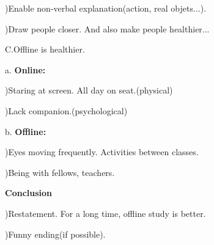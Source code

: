 \documentclass{article}
\begin{document}
{				\qquad{})Enable non-verbal explanation(action, real objets...).

				\qquad{})Draw people closer. And also make people healthier...

		C.\qquad Offline is healthier.

			\qquad a. \textbf {Online:}

				\qquad{})Staring at screen. All day on seat.(physical)

				\qquad{})Lack companion.(psychological)

			\qquad b. \textbf {Offline:}

				\qquad{})Eyes moving frequently. Activities between classes.

				\qquad{})Being with fellows, teachers.

	\noindent\textbf{Conclusion}

		\qquad{})Restatement. For a long time, offline study is better.

		\qquad{})Funny ending(if possible).

}
\end{document}
